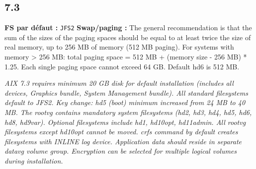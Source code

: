 \documentclass[10pt,a4paper]{article}
\begin{document}
\subsection{7.3}
\noindent\small \textbf{FS par d\'efaut :} \texttt{JFS2} \quad\textbullet\quad \textbf{Swap/paging :} The general recommendation is that the sum of the sizes of the paging spaces should be equal to at least twice the size of real memory, up to 256 MB of memory (512 MB paging). For systems with memory > 256 MB: total paging space = 512 MB + (memory size - 256 MB) * 1.25. Each single paging space cannot exceed 64 GB. Default hd6 is 512 MB.\normalsize\par\smallskip
\noindent\small\textit{AIX 7.3 requires minimum 20 GB disk for default installation (includes all devices, Graphics bundle, System Management bundle). All standard filesystems default to JFS2. Key change: hd5 (boot) minimum increased from 24 MB to 40 MB. The rootvg contains mandatory system filesystems (hd2, hd3, hd4, hd5, hd6, hd8, hd9var). Optional filesystems include hd1, hd10opt, hd11admin. All rootvg filesystems except hd10opt cannot be moved. crfs command by default creates filesystems with INLINE log device. Application data should reside in separate datavg volume group. Encryption can be selected for multiple logical volumes during installation.}\normalsize\par\smallskip
\end{document}
